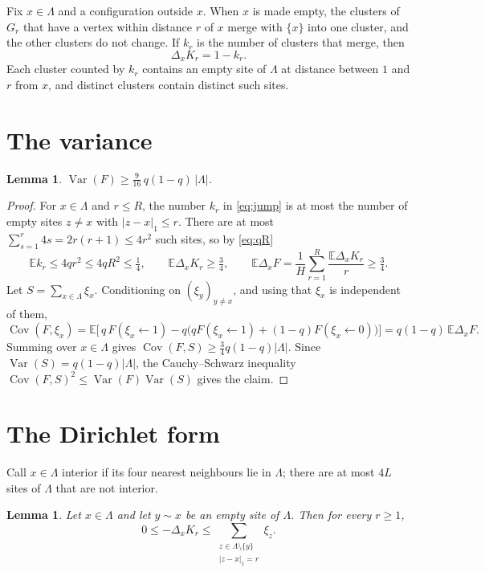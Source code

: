 \documentclass[11pt]{article}
\newtheorem{lemma}[theorem]{Lemma}
\theoremstyle{remark}
\newcommand{\E}{\mathbb E}
\newcommand{\1}{\mathbf 1}
\DeclareMathOperator{\Var}{Var}
\DeclareMathOperator{\Cov}{Cov}
\begin{document}
Fix $x\in\Lambda$ and a configuration outside $x$. When $x$ is made empty, the clusters of $G_r$ that have a vertex within distance $r$ of $x$ merge with $\{x\}$ into one cluster, and the other clusters do not change. If $k_r$ is the number of clusters that merge, then
\begin{equation}\label{eq:jump}
\Delta_xK_r=1-k_r.
\end{equation}
Each cluster counted by $k_r$ contains an empty site of $\Lambda$ at distance between $1$ and $r$ from $x$, and distinct clusters contain distinct such sites.

\section{The variance}

\begin{lemma}\label{lem:var}
$\Var(F)\ge\frac9{16}\,q(1-q)\,|\Lambda|$.
\end{lemma}

\begin{proof}
For $x\in\Lambda$ and $r\le R$, the number $k_r$ in \eqref{eq:jump} is at most the number of empty sites $z\ne x$ with $|z-x|_1\le r$. There are at most $\sum_{s=1}^r4s=2r(r+1)\le4r^2$ such sites, so by \eqref{eq:qR}
\[
\E k_r\le4qr^2\le4qR^2\le\tfrac14,
\qquad
\E\Delta_xK_r\ge\tfrac34,
\qquad
\E\Delta_xF=\frac1H\sum_{r=1}^R\frac{\E\Delta_xK_r}{r}\ge\tfrac34 .
\]
Let $S=\sum_{x\in\Lambda}\xi_x$. Conditioning on $(\xi_y)_{y\ne x}$, and using that $\xi_x$ is independent of them,
\[
\Cov(F,\xi_x)=\E\bigl[\,q\,F(\xi_x\leftarrow1)-q\bigl(qF(\xi_x\leftarrow1)+(1-q)F(\xi_x\leftarrow0)\bigr)\bigr]=q(1-q)\,\E\Delta_xF .
\]
Summing over $x\in\Lambda$ gives $\Cov(F,S)\ge\frac34q(1-q)|\Lambda|$. Since $\Var(S)=q(1-q)|\Lambda|$, the Cauchy--Schwarz inequality $\Cov(F,S)^2\le\Var(F)\Var(S)$ gives the claim.
\end{proof}

\section{The Dirichlet form}

Call $x\in\Lambda$ interior if its four nearest neighbours lie in $\Lambda$; there are at most $4L$ sites of $\Lambda$ that are not interior.

\begin{lemma}\label{lem:pointwise}
Let $x\in\Lambda$ and let $y\sim x$ be an empty site of $\Lambda$. Then for every $r\ge1$,
\[
0\le-\Delta_xK_r\le\sum_{\substack{z\in\Lambda\setminus\{y\}\\ |z-x|_1=r}}\xi_z .
\]
\end{lemma}
\end{document}
